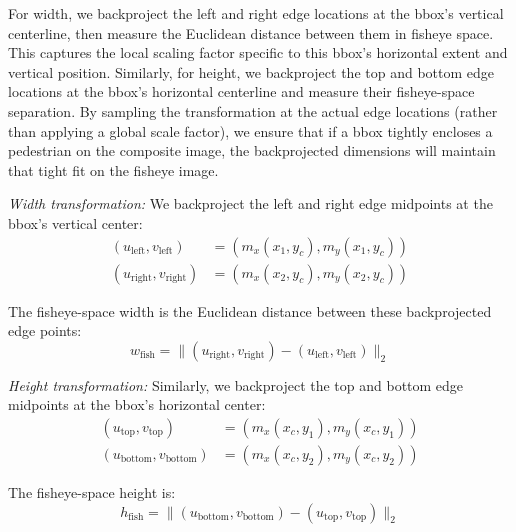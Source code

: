 \documentclass[twocolumn]{svjour3}          %
\begin{document}
For width, we backproject the left and right edge locations at the bbox's vertical centerline, then measure the Euclidean distance between them in fisheye space. This captures the local scaling factor specific to this bbox's horizontal extent and vertical position. Similarly, for height, we backproject the top and bottom edge locations at the bbox's horizontal centerline and measure their fisheye-space separation. By sampling the transformation at the actual edge locations (rather than applying a global scale factor), we ensure that if a bbox tightly encloses a pedestrian on the composite image, the backprojected dimensions will maintain that tight fit on the fisheye image.

\textit{Width transformation:} We backproject the left and right edge midpoints at the bbox's vertical center:
\begin{equation}
    \begin{aligned}
    (u_{\text{left}}, v_{\text{left}}) &= (m_x(x_1, y_c), m_y(x_1, y_c)) \\
    (u_{\text{right}}, v_{\text{right}}) &= (m_x(x_2, y_c), m_y(x_2, y_c))
    \end{aligned}
    \label{eq:width_backproj}
\end{equation}

The fisheye-space width is the Euclidean distance between these backprojected edge points:
\begin{equation}
    w_{\text{fish}} = \|(u_{\text{right}}, v_{\text{right}}) - (u_{\text{left}}, v_{\text{left}})\|_2
    \label{eq:width_fish}
\end{equation}

\textit{Height transformation:} Similarly, we backproject the top and bottom edge midpoints at the bbox's horizontal center:
\begin{equation}
    \begin{aligned}
    (u_{\text{top}}, v_{\text{top}}) &= (m_x(x_c, y_1), m_y(x_c, y_1)) \\
    (u_{\text{bottom}}, v_{\text{bottom}}) &= (m_x(x_c, y_2), m_y(x_c, y_2))
    \end{aligned}
    \label{eq:height_backproj}
\end{equation}

The fisheye-space height is:
\begin{equation}
    h_{\text{fish}} = \|(u_{\text{bottom}}, v_{\text{bottom}}) - (u_{\text{top}}, v_{\text{top}})\|_2
    \label{eq:height_fish}
\end{equation}
\end{document}
